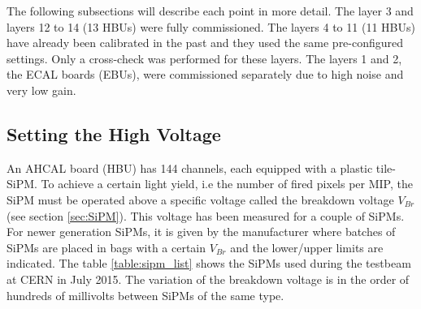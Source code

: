 The following subsections will describe each point in more detail. The layer 3 and layers 12 to 14 (13 HBUs) were fully commissioned. The layers 4 to 11 (11 HBUs) have already been calibrated in the past and they used the same pre-configured settings. Only a cross-check was performed for these layers. The layers 1 and 2, the ECAL boards (EBUs), were commissioned separately due to high noise and very low gain.

\subsection{Setting the High Voltage}

\begin{table}[htb!]
  \centering
  \caption{List of the different SiPMs used in the CALICE AHCAL in July 2015.}
  \label{table:sipm_list}
\end{table}

An AHCAL board (HBU) has 144 channels, each equipped with a plastic tile-SiPM. To achieve a certain light yield, i.e the number of fired pixels per MIP, the SiPM must be operated above a specific voltage called the breakdown voltage $V_{Br}$ (see section \ref{sec:SiPM}). This voltage has been measured for a couple of SiPMs. For newer generation SiPMs, it is given by the manufacturer where batches of SiPMs are placed in bags with a certain $V_{Br}$ and the lower/upper limits are indicated. The table \ref{table:sipm_list} shows the SiPMs used during the testbeam at CERN in July 2015. The variation of the breakdown voltage is in the order of hundreds of millivolts between SiPMs of the same type.


